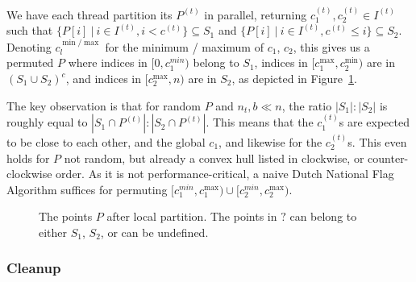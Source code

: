We have each thread partition its $P^{(t)}$ in parallel, returning 
$c_{1}^{(t)}, c_{2}^{(t)} \in I^{(t)}$ such that
$\{P[i] \ | \ i \in I^{(t)}, i < c^{(t)}\} \subseteq S_1$
and $\{P[i] \ | \ i \in I^{(t)}, c^{(t)} \leq i\} \subseteq S_2$.
Denoting $c_{l}^{\min / \max}$ for the minimum / maximum of $c_1$, $c_2$, this
gives us a permuted $P$ where indices in $[0, c_1^{min})$ belong to $S_1$,
indices in $[c_{1}^{\max}, c_2^{\min})$ are in $(S_1 \cup S_2)^c$, and
indices in $[c_2^{\max}, n)$ are in $S_2$, as depicted in 
Figure~\ref{fig:local_part}.

The key observation is that for random $P$ and $n_t, b \ll n$, the ratio 
$|S_1| : |S_2|$ is roughly equal to $|S_1 \cap P^{(t)}| : |S_2 \cap P^{(t)}|$.
This means that the $c_1^{(t)}$s are expected to be close to each other, and
the global $c_1$, and likewise for the $c_2^{(t)}$s. This even holds for $P$
not random, but already a convex hull listed in clockwise, or counter-clockwise
order. As it is not performance-critical, a naive Dutch National Flag Algorithm 
suffices for permuting $[c_1^{min}, c_1^{\max}) \cup [c_2^{min}, c_2^{\max})$.

\begin{figure}[ht]
    \caption{The points $P$ after local partition. The points in $?$ can
             belong to either $S_1$, $S_2$, or can be undefined.}
    \label{fig:local_part}
\end{figure}

\subsubsection{Cleanup}


